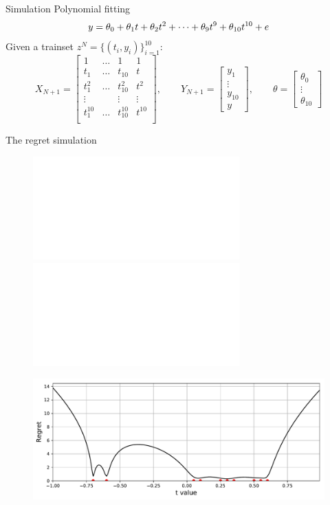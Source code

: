 \documentclass[aspectratio=169]{beamer}
\begin{document}
\begin{frame}{Simulation}
Polynomial fitting
\begin{equation*}
y = \theta_0 + \theta_1 t +  \theta_2 t^2 + \dots +  \theta_9 t^9 + \theta_{10} t^{10} + e
\vspace{10mm}
\end{equation*}
Given a trainset $z^N = \{\left(t_i,y_i\right)\}_{i=1}^{10}$:
\begin{equation*}
X_{N+1} = \begin{bmatrix} 
1       & \dots & 1     &   1       \\
t_1     & \dots & t_{10}   &   t       \\
t_1^2   & \dots & t_{10}^2 &   t^2     \\
\vdots  &       & \vdots &   \vdots  \\
t_1^{10}   & \dots & t_{10}^{10} &   t^{10}     \\ 
\end{bmatrix}, 
\quad \quad
Y_{N+1} = \begin{bmatrix} y_1 \\ \vdots \\ y_{10} \\ y \end{bmatrix},
\quad \quad
\theta = \begin{bmatrix} \theta_0 \\ \vdots \\ \theta_{10} \end{bmatrix}
\end{equation*}
\end{frame}



\begin{frame}{The regret simulation}
\begin{figure}
    \vspace{-0.1cm}
    \centering
    \includegraphics<1>[width=0.6\linewidth]{figures/linear_regression_figures/figure_trainset.pdf}
    \pause
    \includegraphics<2->[width=0.6\linewidth]{figures/linear_regression_figures/figure_poly_experiment_prediction_10_deg.pdf}
    \vspace{-0.5cm}
\end{figure}
\pause
\begin{figure}
    \centering
    \includegraphics[width=0.6\linewidth]{figures/linear_regression_figures/figure_poly_experiment_regret_10_deg.pdf}
\end{figure}
\end{frame}
\end{document}
